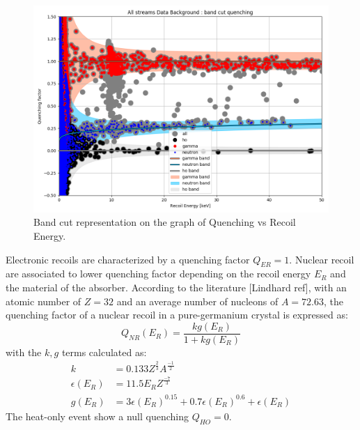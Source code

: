 \begin{figure}
\centering
\includegraphics[width=\linewidth,]{Figures/Neutron/band_cut_quenching.png}
\caption{Band cut representation on the graph of Quenching vs Recoil Energy.}
\label{fig:band-cut-quenching}
\end{figure}

Electronic recoils are characterized by a quenching factor $Q_{ER}=1$. Nuclear recoil are associated to lower quenching factor depending on the recoil energy $E_R$ and the material of the absorber. According to the literature [Lindhard ref], with an atomic number of $Z=32$ and an average number of nucleons of $A=72.63$, the quenching factor of a nuclear recoil in a pure-germanium crystal is expressed as:
\begin{equation}
\label{eq:lindhard}
	Q_{NR}(E_R) = \frac{k g(E_R)}{1+k g(E_R)}
\end{equation}
with the $k,g$ terms calculated as:
\begin{align}
	k &= 0.133 Z^\frac{2}{3} A^\frac{-1}{2} \\
	\epsilon(E_R) &= 11.5 E_R Z^\frac{-7}{3} \\
	g(E_R) &= 3 \epsilon(E_R)^{0.15} + 0.7 \epsilon(E_R)^{0.6} + \epsilon(E_R) 
\end{align}
The heat-only event show a null quenching $Q_{HO}=0$.

